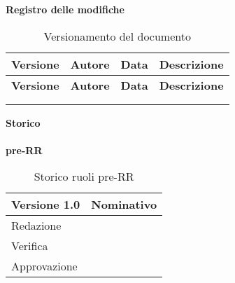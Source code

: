 \Large{\textbf{Registro delle modifiche}}\\
\normalsize

\renewcommand*{\arraystretch}{1.4}
\begin{longtable} [c]{|>{\centering\arraybackslash}m{2cm} | >{\centering\arraybackslash}m{4cm} | >{\centering\arraybackslash}m{3cm} | >{\centering\arraybackslash}m{6cm} |}
		\caption{Versionamento del documento \label{tab:versionamento}}\\
		 \hline
		 \textbf{Versione} & \textbf{Autore} & \textbf{Data} & \textbf{Descrizione}\\
		 \hline
		 \endfirsthead
		 \hline
		 \textbf{Versione} & \textbf{Autore} & \textbf{Data} & \textbf{Descrizione}\\
		 \hline
		\endhead
		 \hline
		 \endfoot
		 \hline
		 \endlastfoot
		  &  &  & \\\\
\end{longtable}

\newpage
\Large{\textbf{Storico }}\\
\normalsize \\

\textbf{pre-RR}
\label{tabVers1}
\begin{table}[h]
	\begin{tabular}{p{} p{}}
		\toprule \textbf{Versione 1.0}	&	\textbf{Nominativo}\\
		\midrule Redazione	& \\
		\midrule Verifica &	\\
		\midrule Approvazione	&	\\
		\bottomrule
	\end{tabular}
	\caption{Storico ruoli pre-RR}
\end{table}